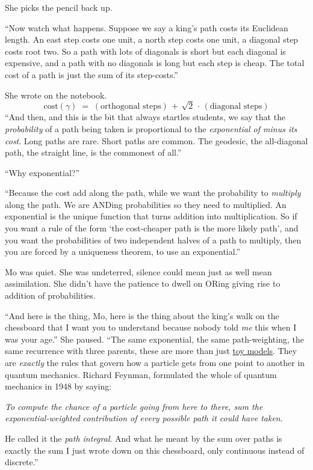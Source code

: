 She picks the pencil back up.
 
``Now watch what happens. Suppose we say a king's path costs its
Euclidean length. An east step costs one unit, a north step costs
one unit, a diagonal step costs root two. So a path with lots of
diagonals is short but each diagonal is expensive, and a path with
no diagonals is long but each step is cheap. The total cost of a
path is just the sum of its step-costs.''
 
She wrote on the notebook.
\[ \text{cost}(\gamma) \;=\; (\text{orthogonal steps})
   \,+\, \sqrt{2} \,\cdot\, (\text{diagonal steps})
\]
``And then, and this is the bit that always startles students, we
say that the \emph{probability} of a path being taken is
proportional to the \emph{exponential of minus its cost}. Long paths
are rare. Short paths are common. The geodesic, the all-diagonal
path, the straight line, is the commonest of all.''
 
``Why exponential?''
 
``Because the cost add along the path, while we want the probability to \emph{multiply} along the path. We are ANDing probabilities so they need to multiplied. An exponential is the unique
function that turns addition into multiplication. So if you want a
rule of the form `the cost-cheaper path is the more likely path', and you want the probabilities of two independent halves of a path to multiply, then you are forced by a uniqueness theorem, to use an
exponential.''
 
Mo was quiet. She was undeterred, silence could mean just as well mean assimilation. She didn't have the patience to dwell on ORing giving rise to addition of probabilities.
 
``And here is the thing, Mo, here is the thing about the king's walk on the chessboard that I want you to understand because nobody told \emph{me} this when I was your age.'' She paused. ``The same exponential, the same
path-weighting, the same recurrence with three parents, these are more than just \href{https://leelemacjames.github.io/fowardsBackwards.pdf}{toy models}. They are \emph{exactly} the rules that govern how a particle gets from one point to another in quantum mechanics.
Richard Feynman,  formulated the whole of quantum mechanics in 1948 by saying:

\emph{To compute the chance of a particle going from here to there,
sum the exponential-weighted contribution of every possible path it
could have taken}. 

He called it the \emph{path integral}. And what he meant by the sum over paths is exactly the sum I just wrote down
on this chessboard, only continuous instead of discrete.''
 
